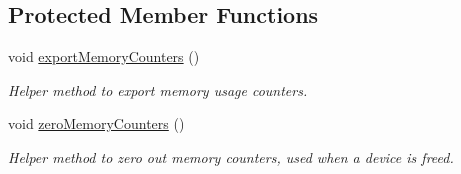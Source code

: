 \subsection*{Protected Member Functions}
\begin{DoxyCompactItemize}
\item 
\mbox{\label{classglow_1_1runtime_1_1_device_manager_abcc952c3f1b9895669ca7a9855346f7a}} 
void \hyperlink{classglow_1_1runtime_1_1_device_manager_abcc952c3f1b9895669ca7a9855346f7a}{export\+Memory\+Counters} ()
\begin{DoxyCompactList}\small\item\em Helper method to export memory usage counters. \end{DoxyCompactList}\item 
\mbox{\label{classglow_1_1runtime_1_1_device_manager_a4b49e79110084226d80fe445d1a9d2cc}} 
void \hyperlink{classglow_1_1runtime_1_1_device_manager_a4b49e79110084226d80fe445d1a9d2cc}{zero\+Memory\+Counters} ()
\begin{DoxyCompactList}\small\item\em Helper method to zero out memory counters, used when a device is freed. \end{DoxyCompactList}\end{DoxyCompactItemize}

